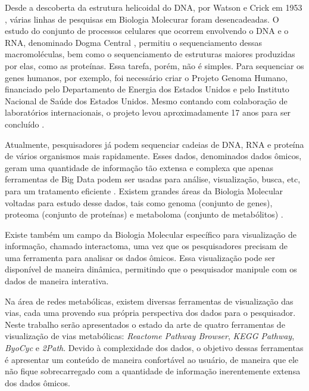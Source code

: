 



\indent Desde a descoberta da estrutura helicoidal do DNA, por Watson e Crick em 1953 \cite{setubal97}, várias linhas de pesquisas em Biologia Molecurar foram desencadeadas. O estudo do conjunto de processos celulares que ocorrem envolvendo o DNA e o RNA, denominado Dogma Central \cite{setubal97}, permitiu o sequenciamento dessas macromoléculas, bem como o sequenciamento de estruturas maiores produzidas por elas, como as proteínas. Essa tarefa, porém, não é simples. Para sequenciar os genes humanos, por exemplo, foi necessário criar o Projeto Genoma Humano, financiado pelo Departamento de Energia dos Estados Unidos e pelo Instituto Nacional de Saúde dos Estados Unidos. Mesmo contando com colaboração de laboratórios internacionais, o projeto levou aproximadamente 17 anos para ser concluído \cite{mount01}.

\indent Atualmente, pesquisadores já podem sequenciar cadeias de DNA, RNA e proteína \cite{mount01} de vários organismos mais rapidamente. Esses dados, denominados dados ômicos, geram uma quantidade de informação tão extensa e complexa que apenas ferramentas de Big Data podem ser usadas para análise, visualização, busca, etc, para um tratamento eficiente \cite{berger13}. Existem grandes áreas da Biologia Molecular voltadas para estudo desse dados, tais como genoma (conjunto de genes), proteoma (conjunto de proteínas) e metaboloma (conjunto de metabólitos) \cite{berger13}.

\indent Existe também um campo da Biologia Molecular específico para visualização de informação, chamado interactoma, uma vez que os pesquisadores precisam de uma ferramenta para analisar os dados ômicos. Essa visualização pode ser disponível de maneira dinâmica, permitindo que o pesquisador manipule com os dados de maneira interativa. 

\indent Na área de redes metabólicas, existem diversas ferramentas de visualização das vias, cada uma provendo sua própria perspectiva dos dados para o pesquisador. Neste trabalho serão apresentados o estado da arte de quatro ferramentas de visualização de vias metabólicas: \textit{Reactome Pathway Browser}, \textit{KEGG Pathway}, \textit{ByoCyc} e \textit{2Path}. Devido à complexidade dos dados, o objetivo dessas ferramentas é apresentar um conteúdo de maneira confortável ao usuário, de maneira que ele não fique sobrecarregado com a quantidade de informação inerentemente extensa dos dados ômicos.

